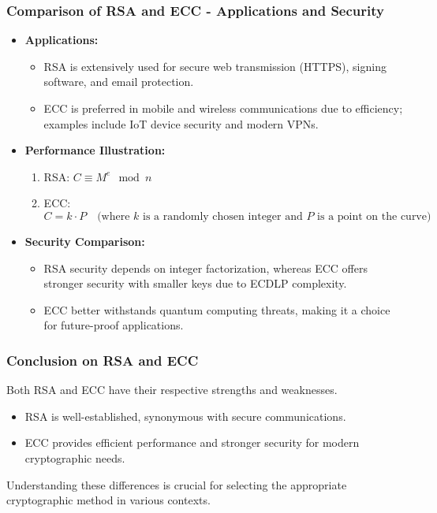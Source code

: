 \documentclass{beamer}
\begin{document}
\begin{frame}[fragile]
    \frametitle{Comparison of RSA and ECC - Applications and Security}
    \begin{itemize}
        \item \textbf{Applications:}
        \begin{itemize}
            \item RSA is extensively used for secure web transmission (HTTPS), signing software, and email protection.
            \item ECC is preferred in mobile and wireless communications due to efficiency; examples include IoT device security and modern VPNs.
        \end{itemize}
        
        \item \textbf{Performance Illustration:}
        \begin{enumerate}
            \item RSA: \( C \equiv M^e \mod n \)
            \item ECC: \( C = k \cdot P \quad \text{(where } k \text{ is a randomly chosen integer and } P \text{ is a point on the curve)} \)
        \end{enumerate}

        \item \textbf{Security Comparison:}
        \begin{itemize}
            \item RSA security depends on integer factorization, whereas ECC offers stronger security with smaller keys due to ECDLP complexity.
            \item ECC better withstands quantum computing threats, making it a choice for future-proof applications.
        \end{itemize}
    \end{itemize}
\end{frame}

\begin{frame}[fragile]
    \frametitle{Conclusion on RSA and ECC}
    Both RSA and ECC have their respective strengths and weaknesses. 
    \begin{itemize}
        \item RSA is well-established, synonymous with secure communications.
        \item ECC provides efficient performance and stronger security for modern cryptographic needs.
    \end{itemize}
    Understanding these differences is crucial for selecting the appropriate cryptographic method in various contexts.
\end{frame}
\end{document}
